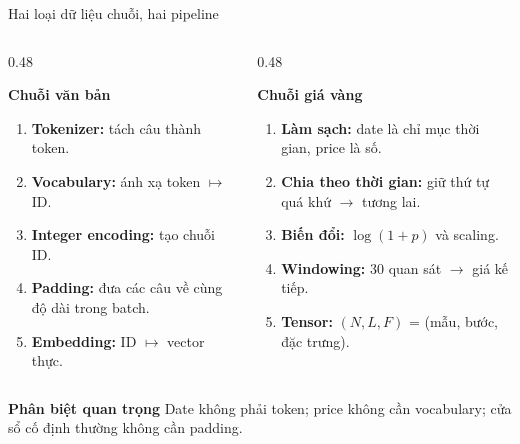 \documentclass[aspectratio=169, 10pt]{beamer}
\begin{document}
\begin{frame}{Hai loại dữ liệu chuỗi, hai pipeline}
\small
\begin{columns}[T]
\begin{column}{0.48\textwidth}
\begin{block}{\textbf{Chuỗi văn bản}}
\begin{enumerate}
\item \textbf{Tokenizer:} tách câu thành token.
\item \textbf{Vocabulary:} ánh xạ token $\mapsto$ ID.
\item \textbf{Integer encoding:} tạo chuỗi ID.
\item \textbf{Padding:} đưa các câu về cùng độ dài trong batch.
\item \textbf{Embedding:} ID $\mapsto$ vector thực.
\end{enumerate}
\end{block}
\end{column}
\begin{column}{0.48\textwidth}
\begin{exampleblock}{\textbf{Chuỗi giá vàng}}
\begin{enumerate}
\item \textbf{Làm sạch:} date là chỉ mục thời gian, price là số.
\item \textbf{Chia theo thời gian:} giữ thứ tự quá khứ $\rightarrow$ tương lai.
\item \textbf{Biến đổi:} $\log(1+p)$ và scaling.
\item \textbf{Windowing:} 30 quan sát $\rightarrow$ giá kế tiếp.
\item \textbf{Tensor:} $(N,L,F)$ = (mẫu, bước, đặc trưng).
\end{enumerate}
\end{exampleblock}
\end{column}
\end{columns}
\vspace{0.18cm}
\begin{alertblock}{\textbf{Phân biệt quan trọng}}
\centering Date không phải token; price không cần vocabulary; cửa sổ cố định thường không cần padding.
\end{alertblock}
\end{frame}
\end{document}
